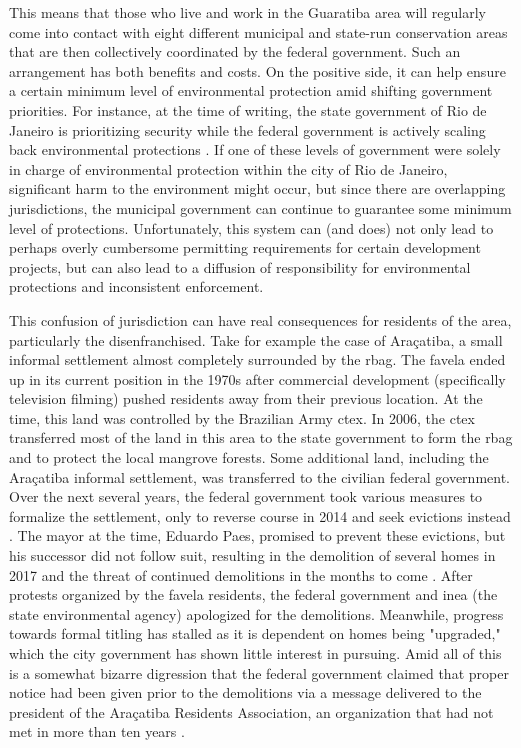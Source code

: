 This means that those who live and work in the Guaratiba area will regularly come into contact with eight different municipal and state-run conservation areas that are then collectively coordinated by the federal government. Such an arrangement has both benefits and costs. On the positive side, it can help ensure a certain minimum level of environmental protection amid shifting government priorities. For instance, at the time of writing, the state government of Rio de Janeiro is prioritizing security \cite{kaiserRioGovernorConfirms2019} while the federal government is actively scaling back environmental protections \cite{simoesBrazilBolsonaroEnvironment2019}. If one of these levels of government were solely in charge of environmental protection within the city of Rio de Janeiro, significant harm to the environment might occur, but since there are overlapping jurisdictions, the municipal government can continue to guarantee some minimum level of protections. Unfortunately, this system can (and does) not only lead to perhaps overly cumbersome permitting requirements for certain development projects, but can also lead to a diffusion of responsibility for environmental protections and inconsistent enforcement. 
 
This confusion of jurisdiction can have real consequences for residents of the area, particularly the disenfranchised. Take for example the case of Araçatiba, a small informal settlement almost completely surrounded by the \ac{rbag}. The favela ended up in its current position in the 1970s after commercial development (specifically television filming) pushed residents away from their previous location. At the time, this land was controlled by the Brazilian Army \ac{ctex}. In 2006, the \ac{ctex} transferred most of the land in this area to the state government to form the \ac{rbag} and to protect the local mangrove forests. Some additional land, including the Araçatiba informal settlement, was transferred to the civilian federal government. Over the next several years, the federal government took various measures to formalize the settlement, only to reverse course in 2014 and seek evictions instead \cite{chisholmWhoInvadingWhom2017}. The mayor at the time, Eduardo Paes, promised to prevent these evictions, but his successor did not follow suit, resulting in the demolition of several homes in 2017 and the threat of continued demolitions in the months to come \cite{stroblSOSAracatibaCommunity2018}. After protests organized by the favela residents, the federal government and \ac{inea} (the state environmental agency) apologized for the demolitions. Meanwhile, progress towards formal titling has stalled as it is dependent on homes being "upgraded," which the city government has shown little interest in pursuing. Amid all of this is a somewhat bizarre digression that the federal government claimed that proper notice had been given prior to the demolitions via a message delivered to the president of the Araçatiba Residents Association, an organization that had not met in more than ten years \cite{stroblFourCoreCriticisms2018}. 

